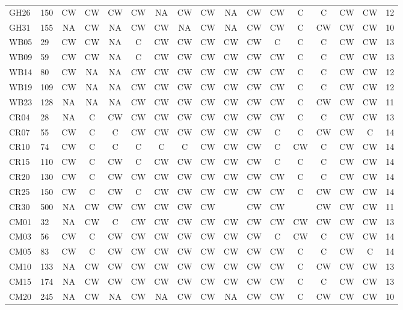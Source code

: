 \documentclass[preprint, authoryear, 12pt]{elsarticle}
\begin{document}
{\begin{longtable}{llccccccccccccccr}
        GH26 & 150 & CW & CW & CW & CW & NA & CW & CW & NA & CW & CW & C & C & CW & CW & 12 \\
        GH31 & 155 & NA & CW & NA & CW & CW & NA & CW & NA & CW & CW & C & CW & CW & CW & 10 \\
        WB05 & 29  & CW & CW & NA & C & CW & CW & CW & CW & CW & C & C & C & CW & CW & 13 \\
        WB09 & 59  & CW & CW & NA & C & CW & CW & CW & CW & CW & CW & C & C & CW & CW & 13 \\
        WB14 & 80  & CW & NA & NA & CW & CW & CW & CW & CW & CW & CW & C & C & CW & CW & 12 \\
        WB19 & 109 & CW & NA & NA & CW & CW & CW & CW & CW & CW & CW & C & C & CW & CW & 12 \\
        WB23 & 128 & NA & NA & NA & CW & CW & CW & CW & CW & CW & CW & C & CW & CW & CW & 11 \\
        CR04 & 28  & NA & C & CW & CW & CW & CW & CW & CW & CW & CW & C & C & CW & CW & 13 \\
        CR07 & 55  & CW & C & C & CW & CW & CW & CW & CW & CW & C & C & CW & CW & C & 14 \\
        CR10 & 74  & CW & C & C & C & C & C & CW & CW & CW & C & CW & C & CW & CW & 14 \\
        CR15 & 110 & CW & C & CW & C & CW & CW & CW & CW & CW & C & C & C & CW & CW & 14 \\
        CR20 & 130 & CW & C & CW & CW & CW & CW & CW & CW & CW & CW & C & C & CW & CW & 14 \\
        CR25 & 150 & CW & C & CW & C & CW & CW & CW & CW & CW & CW & C & CW & CW & CW & 14 \\
        CR30 & 500 & NA & CW & CW & CW & CW & CW & CW &  & CW & CW &  & CW & CW & CW & 11 \\
        CM01 & 32  & NA & CW & C & CW & CW & CW & CW & CW & CW & CW & CW & CW & CW & CW & 13 \\
        CM03 & 56  & CW & C & CW & CW & CW & CW & CW & CW & CW & C & CW & C & CW & CW & 14 \\
        CM05 & 83  & CW & C & CW & CW & CW & CW & CW & CW & CW & CW & C & C & CW & C & 14 \\
        CM10 & 133 & NA & CW & CW & CW & CW & CW & CW & CW & CW & CW & C & CW & CW & CW & 13 \\
        CM15 & 174 & NA & CW & CW & CW & CW & CW & CW & CW & CW & CW & C & C & CW & CW & 13 \\
        CM20 & 245 & NA & CW & NA & CW & NA & CW & CW & NA & CW & CW & C & CW & CW & CW & 10 \\     

\end{longtable}}
\end{document}
